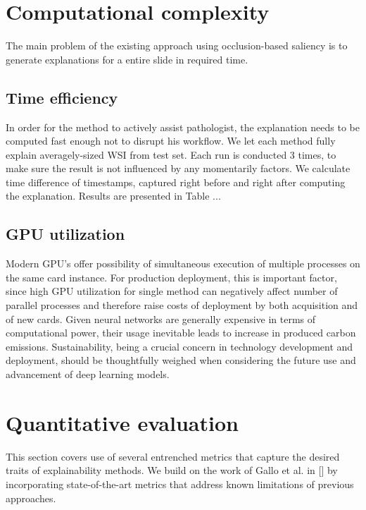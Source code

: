 \section{Computational complexity}

The main problem of the existing approach using occlusion-based saliency is to generate explanations for a entire slide in required time.

\subsection*{Time efficiency}

In order for the method to actively assist pathologist, the explanation needs to be computed fast enough not to disrupt his workflow. We let each method fully explain averagely-sized WSI from test set. Each run is conducted 3 times, to make sure the result is not influenced by any momentarily factors. We calculate time difference of timestamps, captured right before and right after computing the explanation. Results are presented in Table ...

\subsection*{GPU utilization}

Modern GPU's offer possibility of simultaneous execution of multiple processes on the same card instance. For production deployment, this is important factor, since high GPU utilization for single method can negatively affect number of parallel processes and therefore raise costs of deployment by both acquisition and of new cards. Given neural networks are generally expensive in terms of computational power, their usage inevitable leads to increase in produced carbon emissions. Sustainability, being a crucial concern in technology development and deployment, should be thoughtfully weighed when considering the future use and advancement of deep learning models.

\section{Quantitative evaluation}

This section covers use of several entrenched metrics that capture the desired traits of explainability methods. We build on the work of Gallo et al. in [] by incorporating state-of-the-art metrics that address known limitations of previous approaches.

